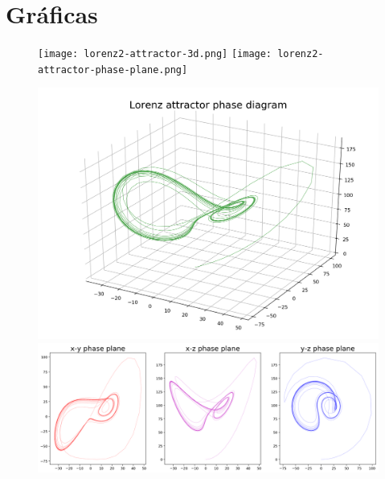 \documentclass{article}
\begin{document}
\section{Gráficas}
\begin{figure}[!ht]
\texttt{[image: lorenz2-attractor-3d.png]}
\texttt{[image: lorenz2-attractor-phase-plane.png]}
\end{figure}
\begin{figure}[!ht]
\includegraphics[width=\linewidth]{lorenz3-attractor-3d.png}
\includegraphics[width=\linewidth]{lorenz3-attractor-phase-plane.png}
\end{figure}
\end{document}
